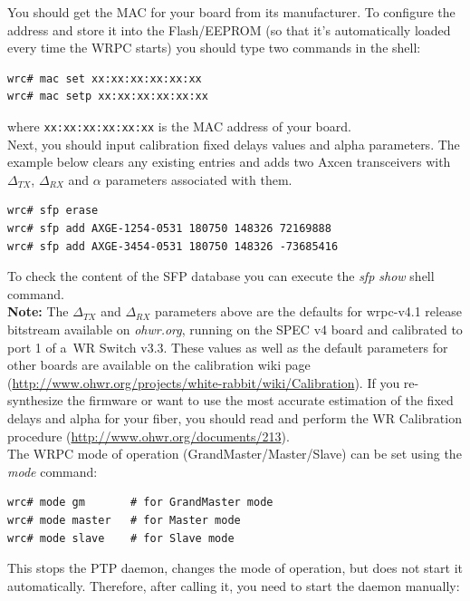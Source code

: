 \documentclass[a4paper, 12pt]{article}
\renewcommand{\_}{\underscore\allowbreak}
\begin{document}
You should get the MAC for your board from its manufacturer. To configure the
address and store it into the Flash/EEPROM (so that it's automatically loaded
every time the WRPC starts) you should type two commands in the shell:
\begin{lstlisting}
wrc# mac set xx:xx:xx:xx:xx:xx
wrc# mac setp xx:xx:xx:xx:xx:xx
\end{lstlisting}
where \texttt{xx:xx:xx:xx:xx:xx} is the MAC address of your board.\\

Next, you should input calibration fixed delays values and alpha parameters. The
example below clears any existing entries and adds two Axcen transceivers with
$\Delta_{TX}$, $\Delta_{RX}$ and $\alpha$ parameters associated with them.

\begin{lstlisting}
wrc# sfp erase
wrc# sfp add AXGE-1254-0531 180750 148326 72169888
wrc# sfp add AXGE-3454-0531 180750 148326 -73685416
\end{lstlisting}

To check the content of the SFP database you can execute the \textit{sfp show}
shell command.\\

\noindent\textbf{Note:} The $\Delta_{TX}$ and $\Delta_{RX}$ parameters above are
the defaults for wrpc-v4.1 release bitstream available on \textit{ohwr.org},
running on the SPEC v4 board and calibrated to port 1 of a~WR Switch
v3.3. These values as well as the default parameters for other boards are
available on the calibration wiki page
(\url{http://www.ohwr.org/projects/white-rabbit/wiki/Calibration}). If you
re-synthesize the firmware or want to use the most accurate estimation of
the fixed delays and alpha for your fiber, you should read and perform the WR
Calibration procedure (\url{http://www.ohwr.org/documents/213}).\\

The WRPC  mode of operation (GrandMaster/Master/Slave) can be set
using the \textit{mode} command:

\begin{lstlisting}
wrc# mode gm       # for GrandMaster mode
wrc# mode master   # for Master mode
wrc# mode slave    # for Slave mode
\end{lstlisting}

This stops the PTP daemon, changes the mode of operation, but does not start it
automatically. Therefore, after calling it, you need to start the daemon
manually:
\end{document}
